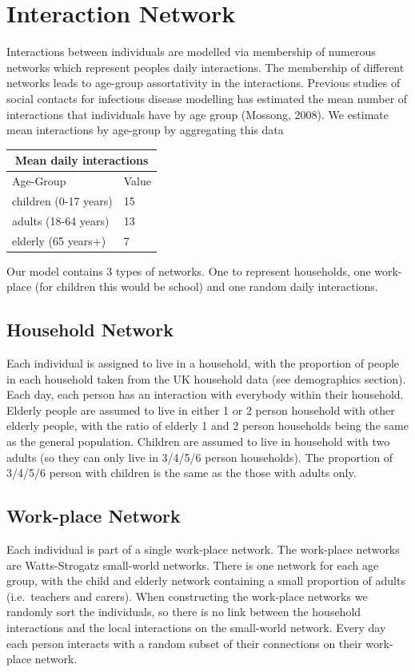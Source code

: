 \documentclass[11pt, oneside]{amsart}   	%
\begin{document}
\section{Interaction Network}

Interactions between individuals are modelled via membership of numerous networks which represent peoples daily interactions.
The membership of different networks leads to age-group assortativity in the interactions.
Previous studies of social contacts for infectious disease modelling has estimated the mean number of interactions that individuals have by age group (Mossong, 2008).
We estimate mean interactions by age-group by aggregating this data 

\medskip \medskip
\begin{table}
\centering
\begin{tabular}{ |p{5cm}|p{1.5cm}|  }
 \hline
 \multicolumn{2}{|c|}{Mean daily interactions} \\
 \hline
Age-Group  & Value \\
 \hline
 \hline 
children (0-17 years) & 15 \\
adults (18-64 years) & 13 \\
elderly (65 years+) & 7 \\
 \hline
\end{tabular}
\end{table}
\medskip \medskip

Our model contains 3 types of networks. One to represent households, one work-place (for children this would be school) and one random daily interactions.

\subsection{Household Network}
Each individual is assigned to live in a household, with the proportion of people in each household taken from the UK household data (see demographics section).
Each day, each person has an interaction with everybody within their household.
Elderly people are assumed to live in either 1 or 2 person household with other elderly people, with the ratio of elderly 1 and 2 person households being the same as the general population.
Children are assumed to live in household with two adults (so they can only live in 3/4/5/6 person households). 
The proportion of 3/4/5/6 person with children is the same as the those with adults only.

\subsection{Work-place Network}
Each individual is part of a single work-place network.
The work-place networks are Watts-Strogatz small-world networks.
There is one network for each age group, with the child and elderly network containing a small proportion of adults (i.e.\ teachers and carers).
When constructing the work-place networks we randomly sort the individuals, so there is no link between the household interactions and the local interactions on the small-world network.
Every day each person interacts with a random subset of their connections on their work-place network.
\end{document}
